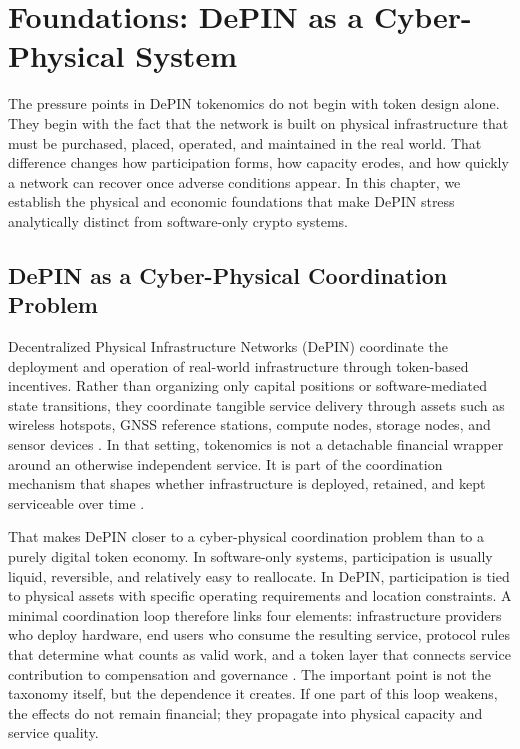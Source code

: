 \section{Foundations: DePIN as a Cyber-Physical System}
\label{sec:foundations_cps}

The pressure points in DePIN tokenomics do not begin with token design alone. They begin with the fact that the network is built on physical infrastructure that must be purchased, placed, operated, and maintained in the real world. That difference changes how participation forms, how capacity erodes, and how quickly a network can recover once adverse conditions appear. In this chapter, we establish the physical and economic foundations that make DePIN stress analytically distinct from software-only crypto systems.

\subsection{DePIN as a Cyber-Physical Coordination Problem}
Decentralized Physical Infrastructure Networks (DePIN) coordinate the deployment and operation of real-world infrastructure through token-based incentives. Rather than organizing only capital positions or software-mediated state transitions, they coordinate tangible service delivery through assets such as wireless hotspots, GNSS reference stations, compute nodes, storage nodes, and sensor devices \cite{FrontiersDePIN2025, Ballandies2023, AndrewBallandies2025}. In that setting, tokenomics is not a detachable financial wrapper around an otherwise independent service. It is part of the coordination mechanism that shapes whether infrastructure is deployed, retained, and kept serviceable over time \cite{Messari2024, FrontiersDePIN2025}.

That makes DePIN closer to a cyber-physical coordination problem than to a purely digital token economy. In software-only systems, participation is usually liquid, reversible, and relatively easy to reallocate. In DePIN, participation is tied to physical assets with specific operating requirements and location constraints. A minimal coordination loop therefore links four elements: infrastructure providers who deploy hardware, end users who consume the resulting service, protocol rules that determine what counts as valid work, and a token layer that connects service contribution to compensation and governance \cite{RochetTirole2003, Chiu2024}. The important point is not the taxonomy itself, but the dependence it creates. If one part of this loop weakens, the effects do not remain financial; they propagate into physical capacity and service quality.

